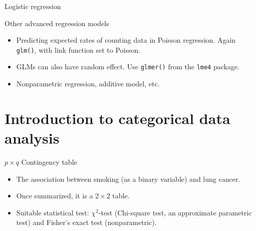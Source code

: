 \begin{frame}[fragile]{Logistic regression}
\begin{knitrout}\footnotesize
{}\color{fgcolor}\begin{kframe}
\begin{alltt}
 \hlkwb{<-}  \hlstd{(}\hlstd{(}\hlstd{,} \hlstd{),} \hlstd{(}\hlstd{,} \hlstd{),} \hlstd{(}\hlstd{,} \hlstd{),} \hlstd{(}\hlstd{,} \hlstd{))}
 \hlkwb{<-} \hlstd{(}\hlstd{(}\hlstd{,} \hlstd{),} \hlstd{(}\hlstd{,} \hlstd{,} \hlstd{),} \hlstd{(}\hlstd{,} \hlstd{,} \hlstd{),} \hlstd{(}\hlstd{,} \hlstd{,} \hlstd{))}
 \hlkwb{<-}  \hlopt{~}  \hlstd{=}\hlstd{(}
\end{alltt}
\end{kframe}
\end{knitrout}
\end{frame}

\begin{frame}{Other advanced regression models}
\begin{itemize}
\item Predicting expected rates of counting data in Poisson
  regression. Again \texttt{glm()}, with link function set to Poisson.
\item GLMs can also have random effect. Use \texttt{glmer()} from the
  \texttt{lme4} package.
\item Nonparametric regression, additive model, etc.
\end{itemize}
\end{frame}

\section{Introduction to categorical data analysis}
\label{sec:categ-data-analys}

\begin{frame}{$p\times q$ Contingency table}
  \begin{itemize}
  \item The association between smoking (as a binary variable) and
    lung cancer.
  \item Once summarized, it is a $2\times 2$ table.
  \item Suitable statistical test: $\chi^{2}$-test (Chi-square test,
    an approximate parametric test) and Fisher's exact test
    (nonparametric).
  \end{itemize}
\end{frame}

